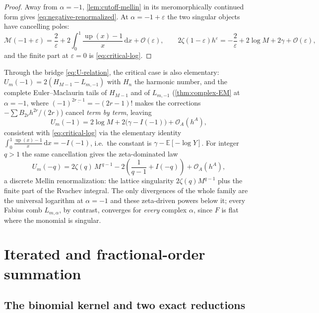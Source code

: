 \documentclass[11pt,oneside]{article}
\numberwithin{equation}{section}
\theoremstyle{definition}
\theoremstyle{remark}
\newcommand{\E}{\mathbb E}
\newcommand{\dd}{\,\mathrm d}
\newcommand{\Up}{\operatorname{up}}
\newcommand{\bigO}{\mathcal O}
\newcommand{\eps}{\varepsilon}
\newcommand{\fall}[2]{#1^{\underline{#2}}}
\newcommand{\Mell}{\mathcal M}
\begin{document}
\begin{proof}
Away from $\alpha=-1$, \cref{lem:cutoff-mellin} in its meromorphically
continued form gives \eqref{eq:negative-renormalized}.  At
$\alpha=-1+\eps$ the two singular objects have cancelling poles:
\[
 \Mell(-1+\eps)=\frac2\eps
 +2\int_0^1\frac{\Up(x)-1}{x}\dd x+\bigO(\eps),
 \qquad
 2\zeta(1-\eps)h^{\eps}
 =-\frac2\eps+2\log M+2\gamma+\bigO(\eps),
\]
and the finite part at $\eps=0$ is \eqref{eq:critical-log}.
\end{proof}

\begin{remark}
Through the bridge \eqref{eq:U-relation}, the critical case is also
elementary: $U_m(-1)=2(H_{M-1}-L_{m,-1})$ with $H_n$ the harmonic
number, and the complete Euler--Maclaurin tails of $H_{M-1}$ and of
$L_{m,-1}$ (\cref{thm:complex-EM} at $\alpha=-1$, where
$\fall{(-1)}{2r-1}=-(2r-1)!$ makes the corrections
$-\sum B_{2r}h^{2r}/(2r)$) cancel \emph{term by term}, leaving
\begin{equation}
 U_m(-1)=2\log M+2\bigl(\gamma-I(-1)\bigr)+\bigO_A(h^{A}),
 \label{eq:critical-log-F}
\end{equation}
consistent with \eqref{eq:critical-log} via the elementary identity
$\int_0^1\frac{\Up(x)-1}{x}\dd x=-I(-1)$, i.e.\ the constant is
$\gamma-\E[-\log Y]$.  For integer $q>1$ the same cancellation gives
the zeta-dominated law
\begin{equation}
 U_m(-q)
 =2\zeta(q)\,M^{\,q-1}
 -2\left(\frac{1}{q-1}+I(-q)\right)
 +\bigO_A(h^{A}),
 \label{eq:U-q}
\end{equation}
a discrete Mellin renormalization: the lattice singularity
$2\zeta(q)M^{q-1}$ plus the finite part of the Rvachev integral.  The
only divergences of the whole family are the universal logarithm at
$\alpha=-1$ and these zeta-driven powers below it; every Fabius comb
$L_{m,\alpha}$, by contrast, converges for \emph{every} complex
$\alpha$, since $F$ is flat where the monomial is singular.
\end{remark}

\section{Iterated and fractional-order summation}
\label{sec:iterated}

\subsection{The binomial kernel and two exact reductions}
\end{document}
